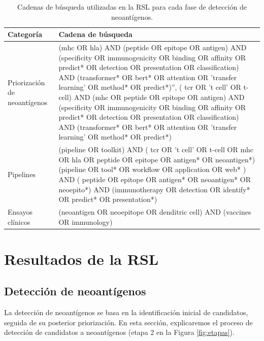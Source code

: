 \begin{table}
	\caption{Cadenas de búsqueda utilizadas en la RSL para cada fase de detección de neoantígenos.}
	\label{tab:search}
	\centering
	\setlength{\tabcolsep}{0.5em} %
	{\renewcommand{\arraystretch}{1.7}%
		\begin{tabular}{p{3cm}p{10cm}}
			\textbf{Categoría} & \textbf{Cadena de búsqueda} \\ \hline
			Priorización de neoantígenos & (mhc OR hla) AND (peptide OR epitope OR antigen) AND (specificity OR immunogenicity OR binding OR affinity OR predict* OR detection OR presentation OR classification) AND (transformer* OR bert* OR attention OR 'transfer learning' OR method* OR predict*)'', ( tcr OR 't cell' OR t-cell) AND (mhc OR peptide OR epitope OR antigen) AND (specificity OR immunogenicity OR binding OR affinity OR predict* OR detection OR presentation OR classification) AND (transformer* OR bert* OR attention OR 'transfer learning' OR method* OR predict*) \\
			
	
			Pipelines & (pipeline OR toolkit) AND ( tcr OR 't cell' OR t-cell OR mhc OR hla OR peptide OR epitope OR antigen* OR neoantigen*) (pipeline OR tool* OR workflow OR application OR web* ) AND ( peptide OR epitope OR antigen* OR neoantigen* OR neoepito*) AND (immunotherapy OR detection OR identify* OR predict* OR presentation*)\\
			
			Ensayos clínicos &  (neoantigen OR neoepitope OR denditric cell) AND (vaccines OR immunology)
			
	\end{tabular}}
\end{table}




\section{Resultados de la RSL}

\subsection{Detección de neoantígenos}

La detección de neoantígenos se basa en la identificación inicial de candidatos, seguida de su posterior priorización. En esta sección, explicaremos el proceso de detección de candidatos a neoantígenos (etapa 2 en la Figura \ref{fig:etapas}).

